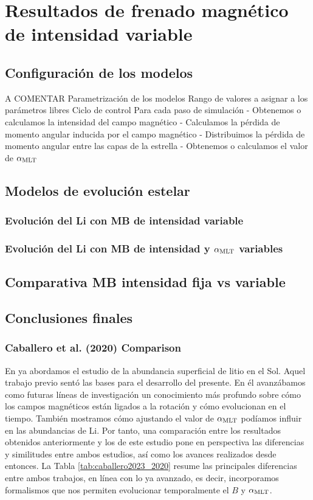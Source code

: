 \chapter{Resultados de frenado magnético de intensidad variable}\label{ch:septimo-capitulo}
\section{Configuración de los modelos} \label{marco_teorico}
A COMENTAR
Parametrización de los modelos
Rango de valores a asignar a los parámetros libres
Ciclo de control
Para cada paso de simulación
- Obtenemos o calculamos la intensidad del campo magnético
- Calculamos la pérdida de momento angular inducida por el campo magnético
- Distribuimos la pérdida de momento angular entre las capas de la estrella
- Obtenemos o calculamos el valor de $\alpha_{\mathrm{MLT}}$


\section{Modelos de evolución estelar}
\subsection{Evolución del Li con MB de intensidad variable}
\subsection{Evolución del Li con MB de intensidad y $\alpha_{\mathrm{MLT}}$ variables}
\section{Comparativa MB intensidad fija vs variable}
\section{Conclusiones finales}
\subsection{Caballero et al. (2020) Comparison}
En \cite{Caballero2020} ya abordamos el estudio de la abundancia superficial de litio en el Sol. Aquel trabajo previo sentó las bases para el desarrollo del presente. En él avanzábamos como futuras líneas de investigación un conocimiento más profundo sobre cómo los campos magnéticos están ligados a la rotación y cómo evolucionan en el tiempo. También mostramos cómo ajustando el valor de $\alpha_{\mathrm{MLT}}$ podíamos influir en las abundancias de Li. Por tanto, una comparación entre los resultados obtenidos anteriormente y los de este estudio pone en perspectiva las diferencias y similitudes entre ambos estudios, así como los avances realizados desde entonces. La Tabla \ref{tab:caballero2023_2020} resume las principales diferencias entre ambos trabajos, en línea con lo ya avanzado, es decir, incorporamos formalismos que nos permiten evolucionar temporalmente el $B$ y $\alpha_{\mathrm{MLT}}$.\par 

